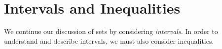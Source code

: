 \section{Intervals and Inequalities}
We continue our discussion of sets by considering \emph{intervals}. In order to understand and describe intervals, we must also consider inequalities.

 
 
 
 
 
% 
% 


 
 
 
 
